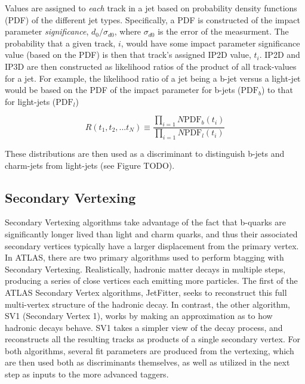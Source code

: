             Values are assigned to \textit{each} track in a jet based on probability density functions (PDF) of the different jet types.
            Specifically, a PDF is constructed of the impact parameter \textit{significance}, $d_0/\sigma_{d0}$,
                where $\sigma_{d0}$ is the error of the measurment.
            The probability that a given track, $i$, would have some impact parameter significance value (based on the PDF)
                is then that track's assigned IP2D value, $t_i$.
            IP2D and IP3D are then constructed as likelihood ratios of the product of all track-values for a jet.
            For example, the likelihood ratio of a jet being a b-jet versus a light-jet would be based on
                the PDF of the impact parameter for b-jets ($\textrm{PDF}_b$) to that for light-jets ($\textrm{PDF}_l$)

            \begin{equation}
                R(t_1, t_2, ... t_N) \equiv \frac{\prod_{i=1}{N} \textrm{PDF}_b(t_i)}{\prod_{i=1}{N} \textrm{PDF}_l(t_i)}
            \end{equation}

            These distributions are then used as a discriminant to distinguish b-jets and charm-jets from light-jets
                (see Figure TODO)\cite{thesis_giacinto}. %

        \subsection{Secondary Vertexing}

            Secondary Vertexing algorithms take advantage of the fact that b-quarks are significantly longer lived than light and charm quarks,
                and thus their associated secondary vertices typically have a larger displacement from the primary vertex.
            In ATLAS, there are two primary algorithms used to perform btagging with Secondary Vertexing.
            Realistically, hadronic matter decays in multiple steps, producing a series of close vertices each emitting more particles.
            The first of the ATLAS Secondary Vertex algorithms, JetFitter, seeks to reconstruct this full multi-vertex structure of the hadronic decay.
            In contrast, the other algorithm, SV1 (Secondary Vertex 1), works by making an approximation as to how hadronic decays behave.
            SV1 takes a simpler view of the decay process, and reconstructs all the resulting tracks as products of a single secondary vertex.
            For both algorithms, several fit parameters are produced from the vertexing,
                which are then used both as discriminants themselves,
                as well as utilized in the next step as inputs to the more advanced taggers\cite{btagging_optimisation}.

